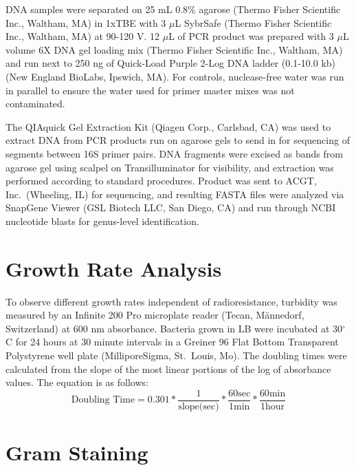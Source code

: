 \documentclass[12pt,twoside]{reedthesis}
\begin{document}
DNA samples were separated on 25 mL 0.8\% agarose (Thermo Fisher Scientific Inc., Waltham, MA) in 1xTBE with 3 \(\mu\)L SybrSafe (Thermo Fisher Scientific Inc., Waltham, MA) at 90-120 V. 12 \(\mu\)L of PCR product was prepared with 3 \(\mu\)L volume 6X DNA gel loading mix (Thermo Fisher Scientific Inc., Waltham, MA) and run next to 250 ng of Quick-Load Purple 2-Log DNA ladder (0.1-10.0 kb) (New England BioLabs, Ipswich, MA). For controls, nuclease-free water was run in parallel to ensure the water used for primer master mixes was not contaminated.

The QIAquick Gel Extraction Kit (Qiagen Corp., Carlsbad, CA) was used to extract DNA from PCR products run on agarose gels to send in for sequencing of segments between 16S primer pairs. DNA fragments were excised as bands from agarose gel using scalpel on Transilluminator for visibility, and extraction was performed according to standard procedures. Product was sent to ACGT, Inc.~(Wheeling, IL) for sequencing, and resulting FASTA files were analyzed via SnapGene Viewer (GSL Biotech LLC, San Diego, CA) and run through NCBI nucleotide blasts for genus-level identification.

\hypertarget{growth-rate-analysis}{%
\section{Growth Rate Analysis}\label{growth-rate-analysis}}

To observe different growth rates independent of radioresistance, turbidity was measured by an Infinite 200 Pro microplate reader (Tecan, Männedorf, Switzerland) at 600 nm absorbance. Bacteria grown in LB were incubated at 30\(^{\circ}\)C for 24 hours at 30 minute intervals in a Greiner 96 Flat Bottom Transparent Polystyrene well plate (MilliporeSigma, St.~Louis, Mo). The doubling times were calculated from the slope of the most linear portions of the log of absorbance values. The equation is as follows:
\begin{equation} 
  \text{Doubling Time} = 0.301 * \frac{1}{\text{slope(sec)}} * \frac{60\text{sec}}{1 \text{min}} * \frac{60\text{min}}{1\text{hour}}
  \label{eq:doubling}
\end{equation}
\hypertarget{gram-staining}{%
\section{Gram Staining}\label{gram-staining}}
\end{document}
